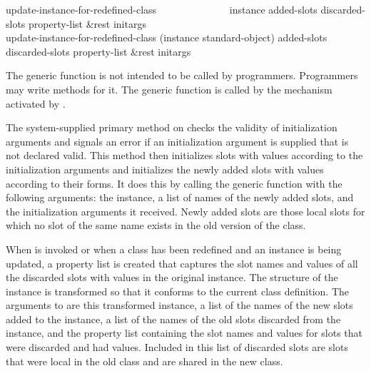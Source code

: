 \begin{defun}
update-instance-for-redefined-class~~~~~~~~~~~~~~ instance added-slots
    discarded-slots property-list &rest initargs \\
update-instance-for-redefined-class (instance standard-object) added-slots
    discarded-slots property-list &rest initargs

\relax
{}
\noindent
The generic function  is not
intended to be called by programmers. Programmers may
write methods for it.  The generic function 
 is called by the mechanism
activated by .

The system-supplied primary method on 
 checks the validity of
initialization arguments and signals an error if an initialization
argument is supplied that is not declared valid.  This method then
initializes slots with values according to the initialization
arguments and initializes the newly added slots with values according
to their  forms.  It does this by calling the generic
function  with the following arguments: the instance,
a list of names of the newly added slots, and the initialization
arguments it received.  Newly added slots are those local slots for which
no slot of the same name exists in the old version of the class.





When  is invoked or when a class has been
redefined and an instance is being updated, a property list is created
that captures the slot names and values of all the discarded slots with
values in the original instance.  The structure of the instance is
transformed so that it conforms to the current class definition.  The
arguments to  are this
transformed instance, a list of the names of the new slots added to the
instance, a list of the names of the old slots discarded from the
instance, and the property list containing the slot names and values for
slots that were discarded and had values.  Included in this list of
discarded slots are slots that were local in the old class and are
shared in the new class.


\end{defun}
